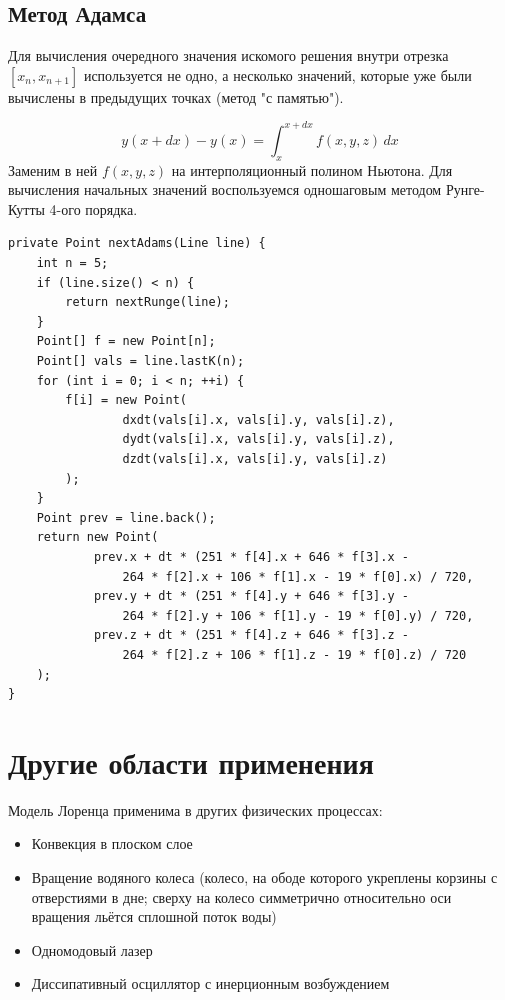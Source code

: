 \documentclass[12pt]{article}
\begin{document}
\subsection{Метод Адамса} 

Для вычисления очередного значения искомого решения внутри отрезка $[x_n, x_{n+1}]$ используется не одно, а несколько значений, которые уже были вычислены в предыдущих точках (метод "с памятью").

\[ y(x+dx)-y(x) = \int_{x}^{x+dx} f(x, y, z)\, dx \] 
Заменим в ней $f(x, y, z)$ на интерполяционный полином Ньютона. Для вычисления начальных значений воспользуемся одношаговым методом Рунге-Кутты 4-ого порядка.

\begin{lstlisting}
private Point nextAdams(Line line) {
    int n = 5;
    if (line.size() < n) {
        return nextRunge(line);
    }
    Point[] f = new Point[n];
    Point[] vals = line.lastK(n);
    for (int i = 0; i < n; ++i) {
        f[i] = new Point(
                dxdt(vals[i].x, vals[i].y, vals[i].z),
                dydt(vals[i].x, vals[i].y, vals[i].z),
                dzdt(vals[i].x, vals[i].y, vals[i].z)
        );
    }
    Point prev = line.back();
    return new Point(
            prev.x + dt * (251 * f[4].x + 646 * f[3].x - 
            	264 * f[2].x + 106 * f[1].x - 19 * f[0].x) / 720,
            prev.y + dt * (251 * f[4].y + 646 * f[3].y - 
            	264 * f[2].y + 106 * f[1].y - 19 * f[0].y) / 720,
            prev.z + dt * (251 * f[4].z + 646 * f[3].z - 
            	264 * f[2].z + 106 * f[1].z - 19 * f[0].z) / 720
    );
}
\end{lstlisting}


\section{Другие области применения}

Модель Лоренца применима в других физических процессах:
\begin{itemize}
	\item Конвекция в плоском слое
	\item Вращение водяного колеса (колесо, на ободе которого укреплены корзины с отверстиями в дне; сверху на колесо симметрично относительно оси вращения льётся сплошной поток воды)
	\item Одномодовый лазер
	\item Диссипативный осциллятор с инерционным возбуждением
\end{itemize}
\end{document}
